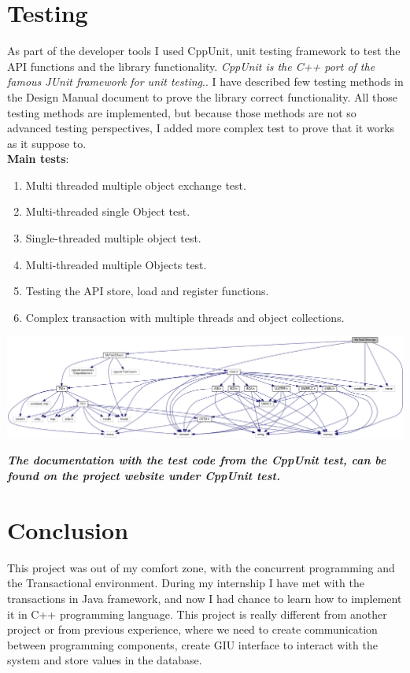 \documentclass[12pt]{article}
\begin{document}
\section{Testing}
As part of the developer tools I used CppUnit, unit testing framework to test the API functions and the library functionality.  
\textit{CppUnit is the C++ port of the famous JUnit framework for unit testing}.\cite{sourceforge}\cite{cookbook}. I have described few testing methods in the Design Manual document to prove the library correct functionality. All those testing methods are implemented, but because those methods are not so advanced testing perspectives, I added more complex test to prove that it works as it suppose to.\\
\textbf{Main tests}:
\begin{enumerate}
\item Multi threaded multiple object exchange test.
\item Multi-threaded single Object test.
\item Single-threaded multiple object test.
\item Multi-threaded multiple Objects test.
\item Testing the API store, load and register functions.
\item Complex transaction with multiple threads and object collections.
\end{enumerate}

\includegraphics[scale=0.2]{Pictures/test.png}

\textit{\textbf{The documentation with the test code from the CppUnit test, can be found on the project website under CppUnit test.}}
\section{Conclusion}
This project was out of my comfort zone, with the concurrent programming and the Transactional environment. During my internship I have met with the transactions in Java framework, and now I had chance to learn how to implement it in C++ programming language. This project is really different from another project or from previous experience, where we need to create communication between programming components, create GIU interface to interact with the system and store values in the database.\\
\end{document}

